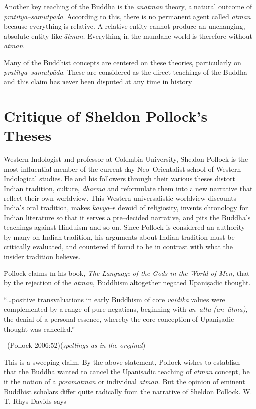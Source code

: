 Another key teaching of the Buddha is the \textit{anātman} theory, a natural outcome of \textit{pratītya–samutpāda}. According to this, there is no permanent agent called \textit{ātman} because everything is relative. A relative entity cannot produce an unchanging, absolute entity like \textit{ātman.} Everything in the mundane world is therefore without \textit{ātman}.

Many of the Buddhist concepts are centered on these theories, particularly on \textit{pratītya–samutpāda}. These are considered as the direct teachings of the Buddha and this claim has never been disputed at any time in history.


\section*{Critique of Sheldon Pollock’s Theses}

Western Indologist and professor at Colombia University, Sheldon Pollock is the most influential member of the current day Neo–Orientalist school of Western Indological studies. He and his followers through their various theses distort Indian tradition, culture, \textit{dharma} and reformulate them into a new narrative that reflect their own worldview. This Western universalistic worldview discounts India’s oral tradition, makes \textit{kāvyā}–s devoid of religiosity, invents chronology for Indian literature so that it serves a pre–decided narrative, and pits the Buddha’s teachings against Hinduism and so on. Since Pollock is considered an authority by many on Indian tradition, his arguments about Indian tradition must be critically evaluated, and countered if found to be in contrast with what the insider tradition believes.

Pollock claims in his book, \textit{The Language of the Gods in the World of Men,} that by the rejection of the \textit{ātman}, Buddhism altogether negated Upaniṣadic thought.

\begin{myquote}
“…positive transvaluations in early Buddhism of core \textit{vaidika} values were complemented by a range of pure negations, beginning with \textit{an–atta (an–ātma)}, the denial of a personal essence, whereby the core conception of Upaniṣadic thought was cancelled.” 

~\hfill (Pollock 2006:52)(\textit{spellings as in the original})
\end{myquote}

This is a sweeping claim. By the above statement, Pollock wishes to establish that the Buddha wanted to cancel the Upaniṣadic teaching of \textit{ātman} concept, be it the notion of a \textit{paramātman} or individual \textit{ātman}. But the opinion of eminent Buddhist scholars differ quite radically from the narrative of Sheldon Pollock. W. T. Rhys Davids says –

